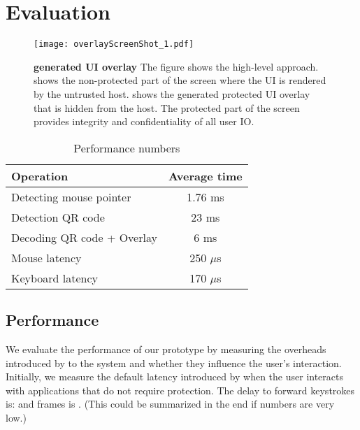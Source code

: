 \section{Evaluation}
\label{sec:eval}

\iffalse
\begin{figure}[t]
\centering
\texttt{[image: overlayScreenShot.pdf]}
\caption{\textbf{\name overlay}. }
\label{fig:screenshot_1}
\centering
\end{figure}
\fi


\begin{figure}[t]
\centering
\texttt{[image: overlayScreenShot\_1.pdf]}
\caption{\textbf{\device generated UI overlay} The figure shows the \name high-level approach. \one shows the non-protected part of the screen where the UI is rendered by the untrusted host. \two shows the \device generated protected UI overlay that is hidden from the host. The protected part of the screen provides integrity and confidentiality of all user IO.}
\spacesave
\label{fig:exampleImpelmentation}
\end{figure}


\begin{table}[t]
\centering
\begin{tabular}{l | c}
\textbf{Operation} & \textbf{Average time} \\\hline
Detecting mouse pointer & 1.76 ms \\
Detection QR code & 23 ms\\
Decoding QR code + Overlay & 6 ms\\
Mouse latency & 250 $\mu$s\\
Keyboard latency & 170 $\mu$s\\\hline
\end{tabular} 
\caption{Performance numbers}\spacesave
\end{table}

\subsection{Performance}

We evaluate the performance of our prototype by measuring the overheads introduced by \name to the system and whether they influence the user's interaction. Initially, we measure the default latency introduced by \device when the user interacts with applications that do not require protection. The delay to forward keystrokes is:  and frames is . (This could be summarized in the end if numbers are very low.)

